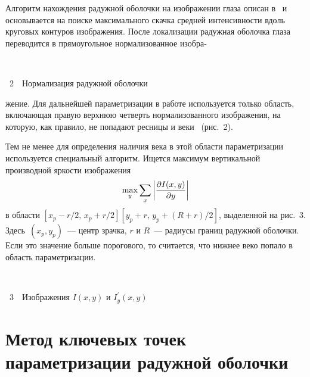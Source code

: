 \begin{multicols}{2}
Алгоритм нахождения радужной оболочки на изображении глаза описан в~\cite{5pav, 7pav} и 
основывается на поиске максимального скачка средней интенсивности вдоль круговых контуров 
изображения. После локализации радужная оболочка глаза переводится в прямоугольное 
нормализованное изобра-\linebreak\vspace*{-12pt}


\noindent
\begin{center} %
\vspace*{6pt}
\mbox{%
\epsfxsize=78.847mm %
}
\vspace*{6pt}

{{\figurename~2}\ \ \small{Нормализация радужной оболочки}}
\end{center}


\bigskip
\addtocounter{figure}{1}


\noindent
жение. Для дальнейшей параметризации в работе используется только 
область, включающая правую верхнюю четверть нормализованного изображения, на которую, 
как правило, не попадают ресницы и веки~\cite{5pav} (рис.~2).


Тем не менее для определения наличия века в этой области параметризации используется 
специальный алгоритм. 
Ищется максимум вертикальной производной яркости изображения 
$$
\underset{y}{\max}\sum\limits_x\left\vert \displaystyle\frac{\displaystyle \partial I(x,y)\mathstrut}{\displaystyle \partial y\mathstrut}\right\vert
$$
в области $[x_p-r/2,\,x_p+r/2][y_p+r,\,y_p+(R+r)/2]$, выделенной на рис.~3. 
Здесь~$(x_p,y_p)$~--- центр зрачка,
 $r$ и $R$~--- радиусы границ радужной оболочки. Если это 
значение больше порогового, то считается, что нижнее веко попало в область параметризации.

\begin{center} %
\vspace*{6pt}
\mbox{%
\epsfxsize=80.281mm 
}

{{\figurename~3}\ \ \small{Изображения $I(x,y)$ и $I_y^\prime(x,y)$}}
\end{center}

\addtocounter{figure}{1}

 
\section{Метод ключевых точек параметризации радужной оболочки}


\end{multicols}
